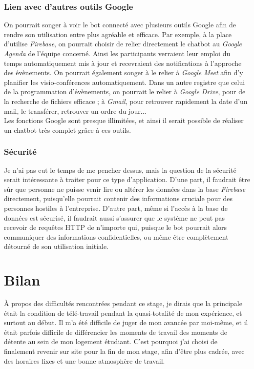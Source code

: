 \documentclass[stage2a]{tnreport} %
\begin{document}
\subsection{Lien avec d'autres outils Google}
On pourrait songer à voir le bot connecté avec plusieurs outils Google afin de rendre son utilisation entre plus agréable et efficace. Par exemple, à la place d'utilise \emph{Firebase}, on pourrait choisir de relier directement le chatbot au \emph{Google Agenda} de l'équipe concerné. Ainsi les participants verraient leur emploi du temps automatiquement mis à jour et recevraient des notifications à l'approche des évènements. On pourrait également songer à le relier à \emph{Google Meet} afin d'y planifier les visio-conférences automatiquement. Dans un autre registre que celui de la programmation d'évènements, on pourrait le relier à \emph{Google Drive}, pour de la recherche de fichiers efficace ; à \emph{Gmail}, pour retrouver rapidement la date d'un mail, le transférer, retrouver un ordre du jour... \\
Les fonctions Google sont presque illimitées, et ainsi il serait possible de réaliser un chatbot très complet grâce à ces outils.

\subsection{Sécurité}
Je n'ai pas eut le temps de me pencher dessus, mais la question de la sécurité serait intéressante à traiter pour ce type d'application. D'une part, il faudrait être sûr que personne ne puisse venir lire ou altérer les données dans la base \emph{Firebase} directement, puisqu'elle pourrait contenir des informations cruciale pour des personnes hostiles à l'entreprise. D'autre part, même si l'accès à la base de données est sécurisé, il faudrait aussi s'assurer que le système ne peut pas recevoir de requêtes HTTP de n'importe qui, puisque le bot pourrait alors communiquer des informations confidentielles, ou même être complètement détourné de son utilisation initiale.

\clearpage

\chapter{Bilan}

\`{A} propos des difficultés rencontrées pendant ce stage, je dirais que la principale était la condition de télé-travail pendant la quasi-totalité de mon expérience, et surtout au début. Il m'a été difficile de juger de mon avancée par moi-même, et il était parfois difficile de différencier les moments de travail des moments de détente au sein de mon logement étudiant. C'est pourquoi j'ai choisi de finalement revenir sur site pour la fin de mon stage, afin d'être plus cadrée, avec des horaires fixes et une bonne atmosphère de travail. \\
\end{document}

